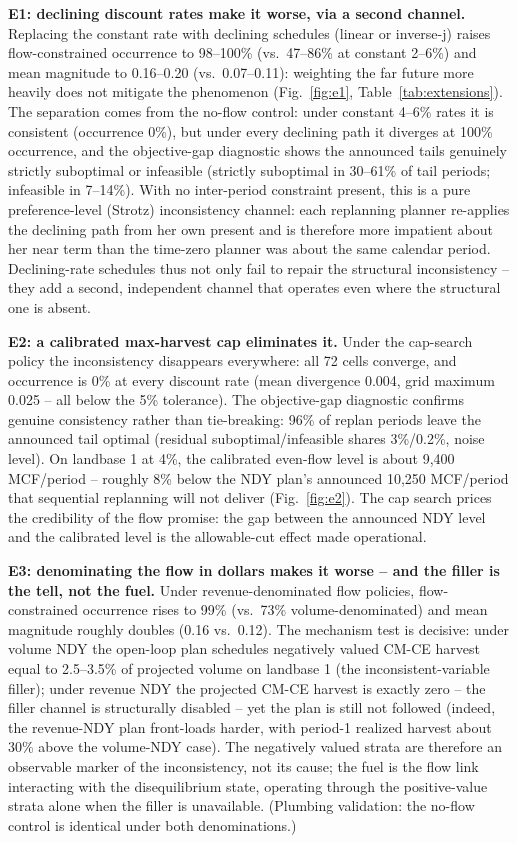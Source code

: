 \textbf{E1: declining discount rates make it worse, via a second channel.} Replacing the constant rate with declining schedules (linear or inverse-j) raises flow-constrained occurrence to 98--100\% (vs.\ 47--86\% at constant 2--6\%) and mean magnitude to 0.16--0.20 (vs.\ 0.07--0.11): weighting the far future more heavily does not mitigate the phenomenon (Fig.~\ref{fig:e1}, Table~\ref{tab:extensions}). The separation comes from the no-flow control: under constant 4--6\% rates it is consistent (occurrence 0\%), but under every declining path it diverges at 100\% occurrence, and the objective-gap diagnostic shows the announced tails genuinely strictly suboptimal or infeasible (strictly suboptimal in 30--61\% of tail periods; infeasible in 7--14\%). With no inter-period constraint present, this is a pure preference-level (Strotz) inconsistency channel: each replanning planner re-applies the declining path from her own present and is therefore more impatient about her near term than the time-zero planner was about the same calendar period. Declining-rate schedules thus not only fail to repair the structural inconsistency -- they add a second, independent channel that operates even where the structural one is absent.

\textbf{E2: a calibrated max-harvest cap eliminates it.} Under the cap-search policy the inconsistency disappears everywhere: all 72 cells converge, and occurrence is 0\% at every discount rate (mean divergence 0.004, grid maximum 0.025 -- all below the 5\% tolerance). The objective-gap diagnostic confirms genuine consistency rather than tie-breaking: 96\% of replan periods leave the announced tail optimal (residual suboptimal/infeasible shares 3\%/0.2\%, noise level). On landbase 1 at 4\%, the calibrated even-flow level is about 9,400 MCF/period -- roughly 8\% below the NDY plan's announced 10,250 MCF/period that sequential replanning will not deliver (Fig.~\ref{fig:e2}). The cap search prices the credibility of the flow promise: the gap between the announced NDY level and the calibrated level is the allowable-cut effect made operational.

\textbf{E3: denominating the flow in dollars makes it worse -- and the filler is the tell, not the fuel.} Under revenue-denominated flow policies, flow-constrained occurrence rises to 99\% (vs.\ 73\% volume-denominated) and mean magnitude roughly doubles (0.16 vs.\ 0.12). The mechanism test is decisive: under volume NDY the open-loop plan schedules negatively valued CM-CE harvest equal to 2.5--3.5\% of projected volume on landbase 1 (the inconsistent-variable filler); under revenue NDY the projected CM-CE harvest is exactly zero -- the filler channel is structurally disabled -- yet the plan is still not followed (indeed, the revenue-NDY plan front-loads harder, with period-1 realized harvest about 30\% above the volume-NDY case). The negatively valued strata are therefore an observable marker of the inconsistency, not its cause; the fuel is the flow link interacting with the disequilibrium state, operating through the positive-value strata alone when the filler is unavailable. (Plumbing validation: the no-flow control is identical under both denominations.)

